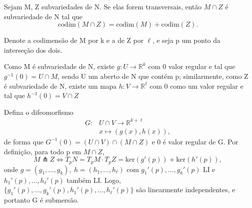 \documentclass[../differential_topology.tex]{subfiles}
\begin{document}
\begin{theorem*}
	Sejam M, Z subvariedades de N. Se elas forem transversais, então \(M\cap Z\) é subvariedade de N tal que
	\[
		\mathrm{codim}(M\cap Z) = \mathrm{codim}(M)+\mathrm{codim}(Z).
	\]
\end{theorem*}
\begin{proof*}
	Denote a codimensão de M por k e a de Z por \(\ell \), e seja p um ponto da interseção dos dois.

	Como M é subvariedade de N, existe \(g:U\rightarrow \mathbb{R}^{k}\) com 0 valor regular e tal que \(g^{-1}(0)=U\cap M\), sendo U um aberto de N que contém p; similarmente, como Z é subvariedade de N, existe um mapa \(h:V\rightarrow \mathbb{R}^{\ell }\) com 0 como um valor regular e tal que \(h^{-1}(0) = V\cap Z\)

	Defina o difeomorfismo
	\begin{align*}
		G: & U\cap V\rightarrow\mathbb{R}^{k+\ell } \\
		   & x\longmapsto (g(x), h(x)),
	\end{align*}
	de forma que \(G^{-1}(0)=(U\cap V)\cap (M\cap Z)\) e 0 é valor regular de G. Por definição, para todo p em \(M\cap Z\),
	\[
		M\pitchfork Z \Longleftrightarrow T_{p}N = T_{p}M \cdot T_{p}Z = \mathrm{ker}(g'(p))+\mathrm{ker}(h'(p)),
	\]
	onde \(g=(g_1, \dotsc , g_{k}),\; h=(h_1, \dotsc , h_{\ell})\) com \(g_1'(p), \dotsc , g_{k}'(p)\) LI e \(h_{1}'(p), \dotsc , h_{\ell}'(p)\) também LI. Logo, \(\{g_{1}'(p), \dotsc , g_{k}'(p), h_{1}'(p), \dotsc , h_{\ell }'(p)\}\) são linearmente independentes, e portanto G é submersão. \qedsymbol

\end{proof*}
\end{document}
